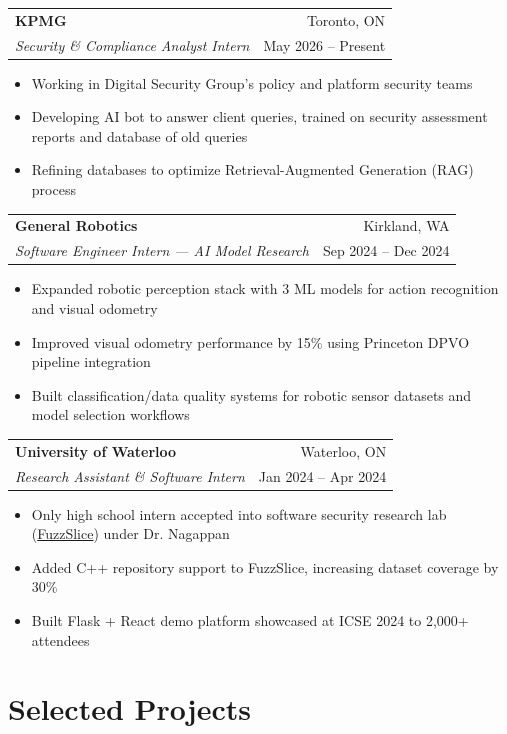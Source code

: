 \documentclass[11pt,letterpaper]{article}
\makeatletter
\newcommand{\resumeItem}[1]{
    \item \small{#1}
}
\newcommand{\entry}[4]{
\vspace{0.15em}
\begin{tabularx}{\textwidth}{@{}Xr@{}}
{\textbf{#1}} & {\small \textcolor{muted}{#2}} \\
{\small\textit{#3}} & {\small \textcolor{muted}{#4}}
\end{tabularx}
}
\makeatother
\begin{document}
\entry
{KPMG}
{Toronto, ON}
{Security \& Compliance Analyst Intern}
{May 2026 -- Present}

\vspace{-0.55em}

\begin{itemize}
    \resumeItem{Working in Digital Security Group's policy and platform security teams}
    \resumeItem{Developing AI bot to answer client queries, trained on security assessment reports and database of old queries}
    \resumeItem{Refining databases to optimize Retrieval-Augmented Generation (RAG) process}
\end{itemize}

\vspace{0.15em}

\entry
{General Robotics}
{Kirkland, WA}
{Software Engineer Intern — AI Model Research}
{Sep 2024 -- Dec 2024}

\vspace{-0.55em}

\begin{itemize}
    \resumeItem{Expanded robotic perception stack with 3 ML models for action recognition and visual odometry}
    \resumeItem{Improved visual odometry performance by 15\% using Princeton DPVO pipeline integration}
    \resumeItem{Built classification/data quality systems for robotic sensor datasets and model selection workflows}
\end{itemize}

\vspace{0.15em}

\entry
{University of Waterloo}
{Waterloo, ON}
{Research Assistant \& Software Intern}
{Jan 2024 -- Apr 2024}

\vspace{-0.55em}

\begin{itemize}
    \resumeItem{Only high school intern accepted into software security research lab (\href{https://fuzzslice.com/}{FuzzSlice}) under Dr. Nagappan}
    \resumeItem{Added C++ repository support to FuzzSlice, increasing dataset coverage by 30\%}
    \resumeItem{Built Flask + React demo platform showcased at ICSE 2024 to 2,000+ attendees}
\end{itemize}


\section*{Selected Projects}
\end{document}
